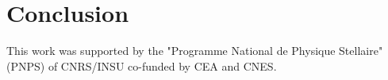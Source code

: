 \documentclass{/Users/art2/TeX/aanda/aa}
\def\kms {km\,s$^{-1}$}
\begin{document}





\section{Conclusion}


\begin{acknowledgements}
This work was supported by the "Programme National de Physique Stellaire" (PNPS) of CNRS/INSU co-funded by CEA and CNES.
\end{acknowledgements}


%



 
\end{document}

